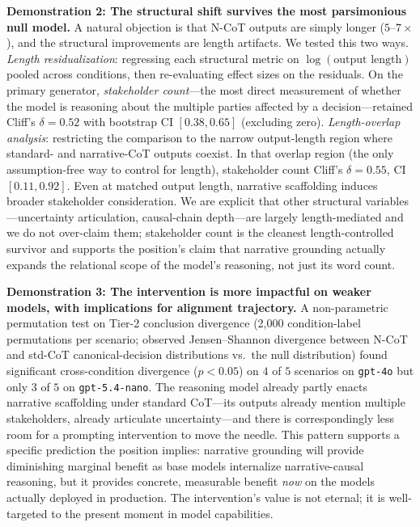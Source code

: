 \documentclass{article}
\theoremstyle{plain}
\theoremstyle{definition}
\theoremstyle{remark}
\begin{document}
\textbf{Demonstration 2: The structural shift survives the most parsimonious null model.} A natural objection is that N-CoT outputs are simply longer ($5$--$7\times$), and the structural improvements are length artifacts. We tested this two ways. \emph{Length residualization}: regressing each structural metric on $\log(\text{output length})$ pooled across conditions, then re-evaluating effect sizes on the residuals. On the primary generator, \emph{stakeholder count}---the most direct measurement of whether the model is reasoning about the multiple parties affected by a decision---retained Cliff's $\delta = 0.52$ with bootstrap CI $[0.38, 0.65]$ (excluding zero). \emph{Length-overlap analysis}: restricting the comparison to the narrow output-length region where standard- and narrative-CoT outputs coexist. In that overlap region (the only assumption-free way to control for length), stakeholder count Cliff's $\delta = 0.55$, CI $[0.11, 0.92]$. Even at matched output length, narrative scaffolding induces broader stakeholder consideration. We are explicit that other structural variables---uncertainty articulation, causal-chain depth---are largely length-mediated and we do not over-claim them; stakeholder count is the cleanest length-controlled survivor and supports the position's claim that narrative grounding actually expands the relational scope of the model's reasoning, not just its word count.

\textbf{Demonstration 3: The intervention is more impactful on weaker models, with implications for alignment trajectory.} A non-parametric permutation test on Tier-2 conclusion divergence (2{,}000 condition-label permutations per scenario; observed Jensen--Shannon divergence between N-CoT and std-CoT canonical-decision distributions vs.\ the null distribution) found significant cross-condition divergence ($p < 0.05$) on $4$ of $5$ scenarios on \texttt{gpt-4o} but only $3$ of $5$ on \texttt{gpt-5.4-nano}. The reasoning model already partly enacts narrative scaffolding under standard CoT---its outputs already mention multiple stakeholders, already articulate uncertainty---and there is correspondingly less room for a prompting intervention to move the needle. This pattern supports a specific prediction the position implies: narrative grounding will provide diminishing marginal benefit as base models internalize narrative-causal reasoning, but it provides concrete, measurable benefit \emph{now} on the models actually deployed in production. The intervention's value is not eternal; it is well-targeted to the present moment in model capabilities.
\end{document}

